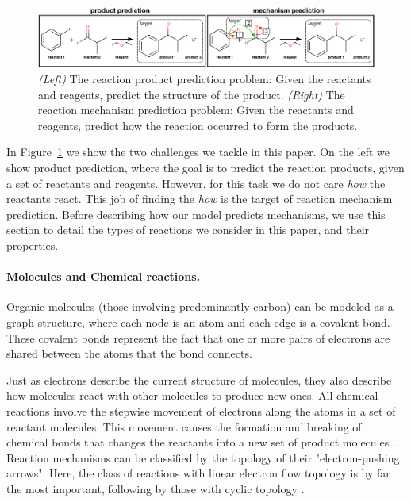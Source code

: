 

\begin{figure}[t!]
\centering
\includegraphics[width=\textwidth]{reaction_diagram}
\caption{\emph{(Left)} The reaction product prediction problem: Given the reactants and reagents, predict the structure of the product. \emph{(Right)} The reaction mechanism prediction problem: Given the reactants and reagents, predict how the reaction occurred to form the products.}
\label{fig:task-overview}

\end{figure}


In Figure~\ref{fig:task-overview} we show the two challenges we tackle in this paper. 
On the left we show product prediction, where the goal is to predict the reaction products, given a set of reactants and reagents. However, for this task we do not care {\em how} the reactants react.
 This job of finding the {\em how} is the target of reaction mechanism prediction. 
 Before describing how our model predicts mechanisms, we use this section to detail the types of reactions we consider in this paper, and their properties.



\vspace{-0.15cm}
\paragraph{Molecules and Chemical reactions.}


Organic molecules (those involving predominantly carbon) can be modeled as a graph structure, where each node is an atom and each edge is a covalent bond.
These covalent bonds represent the fact that 
one or more pairs of electrons are shared between the atoms that the bond connects. 


Just as electrons describe the current structure of molecules, 
they also describe how molecules react with other molecules to produce new ones. All chemical reactions involve the stepwise movement of electrons along the atoms in a set of reactant molecules. 
This movement causes the formation and breaking of chemical bonds that changes the reactants into a new set of product molecules \cite{herges1994coarctate}. 
%
Reaction mechanisms can be classified by the topology of their "electron-pushing arrows". Here, the class of reactions with linear electron flow topology is by far the most important, following by those with cyclic topology \citep{herges1994coarctate}.

